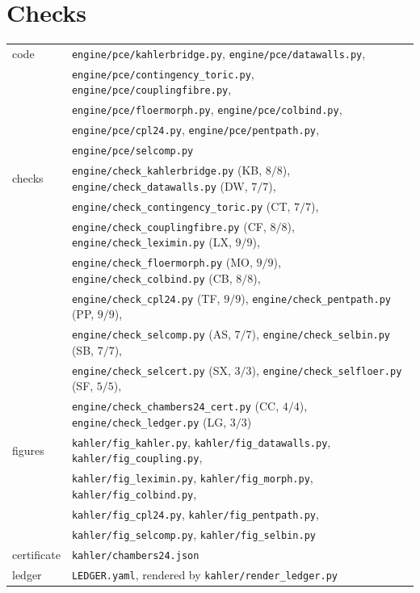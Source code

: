 \documentclass[11pt]{article}
\theoremstyle{definition}\newtheorem{definition}[theorem]{Definition}\newtheorem{remark}[theorem]{Remark}\newtheorem{example}[theorem]{Example}\newtheorem{problem}[theorem]{Open problem}\crefname{problem}{Problem}{Problems}
\begin{document}
\section*{Checks}
\begin{center}\small
\begin{tabular}{ll}\toprule
code & \texttt{engine/pce/kahlerbridge.py}, \texttt{engine/pce/datawalls.py},\\ & \texttt{engine/pce/contingency\_toric.py}, \texttt{engine/pce/couplingfibre.py},\\ & \texttt{engine/pce/floermorph.py}, \texttt{engine/pce/colbind.py},\\ & \texttt{engine/pce/cpl24.py}, \texttt{engine/pce/pentpath.py},\\ & \texttt{engine/pce/selcomp.py}\\
checks & \texttt{engine/check\_kahlerbridge.py} (KB, $8/8$), \texttt{engine/check\_datawalls.py} (DW, $7/7$),\\
 & \texttt{engine/check\_contingency\_toric.py} (CT, $7/7$),\\ & \texttt{engine/check\_couplingfibre.py} (CF, $8/8$), \texttt{engine/check\_leximin.py} (LX, $9/9$),\\ & \texttt{engine/check\_floermorph.py} (MO, $9/9$), \texttt{engine/check\_colbind.py} (CB, $8/8$),\\ & \texttt{engine/check\_cpl24.py} (TF, $9/9$), \texttt{engine/check\_pentpath.py} (PP, $9/9$),\\ & \texttt{engine/check\_selcomp.py} (AS, $7/7$), \texttt{engine/check\_selbin.py} (SB, $7/7$),\\ & \texttt{engine/check\_selcert.py} (SX, $3/3$), \texttt{engine/check\_selfloer.py} (SF, $5/5$),\\ & \texttt{engine/check\_chambers24\_cert.py} (CC, $4/4$), \texttt{engine/check\_ledger.py} (LG, $3/3$)\\
figures & \texttt{kahler/fig\_kahler.py}, \texttt{kahler/fig\_datawalls.py}, \texttt{kahler/fig\_coupling.py},\\ & \texttt{kahler/fig\_leximin.py}, \texttt{kahler/fig\_morph.py}, \texttt{kahler/fig\_colbind.py},\\ & \texttt{kahler/fig\_cpl24.py}, \texttt{kahler/fig\_pentpath.py},\\ & \texttt{kahler/fig\_selcomp.py}, \texttt{kahler/fig\_selbin.py}\\ certificate & \texttt{kahler/chambers24.json}\\ ledger & \texttt{LEDGER.yaml}, rendered by \texttt{kahler/render\_ledger.py}\\\bottomrule
\end{tabular}
\end{center}
\end{document}

